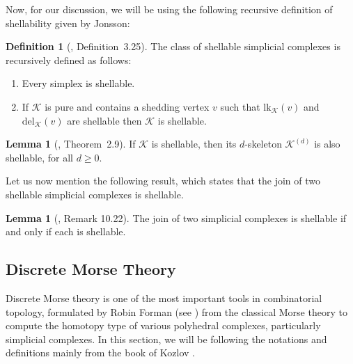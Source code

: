 \documentclass[11pt,reqno,a4paper]{amsart}
\theoremstyle{definition}
\newtheorem{definition}{Definition}[section]
\theoremstyle{theorem}
\newtheorem{lemma}[theorem]{Lemma}
\newcommand{\lno}{\left(}
\newcommand{\rno}{\right)}
\newcommand{\lk}{\mathrm{lk}}
\newcommand{\del}{\mathrm{del}}
\theoremstyle{remark}
\begin{document}
Now, for our discussion, we will be using the following recursive definition of shellability given by Jonsson:

\begin{definition}[\cite{jonsson2008simplicial}, Definition~3.25]\label{def: shellability definition we used}
    The class of shellable simplicial complexes is recursively defined as follows:
    \begin{enumerate}
        \item Every simplex is shellable.
        \item If $\mathcal{K}$ is pure and contains a shedding vertex $v$ such that $\lk_{\mathcal{K}}\lno v\rno$ and $\del_{\mathcal{K}}\lno v\rno$ are shellable then $\mathcal{K}$ is shellable.
    \end{enumerate}
\end{definition}


\begin{lemma}[\cite{Bjornershellable}, Theorem~2.9]\label{shellability of skeleton}
	If $\mathcal{K}$ is shellable, then its $d$-skeleton $\mathcal{K}^{(d)}$ is also shellable, for all $d\geq 0$.
\end{lemma}

Let us now mention the following result, which states that the join of two shellable simplicial complexes is shellable.

\begin{lemma}[\cite{Wachs97b}, Remark 10.22]\label{join is shellable}
    The join of two simplicial complexes is shellable if and only if each is shellable.
\end{lemma}

\subsection{Discrete Morse Theory}
Discrete Morse theory is one of the most important tools in combinatorial topology, formulated by Robin Forman (see \cite{forman1998morse, forman2002user}) from the classical Morse theory to compute the homotopy type of various polyhedral complexes, particularly simplicial complexes. In this section, we will be following the notations and definitions mainly from the book of Kozlov \cite{kozlovCombAlgTopo}.
\end{document}
